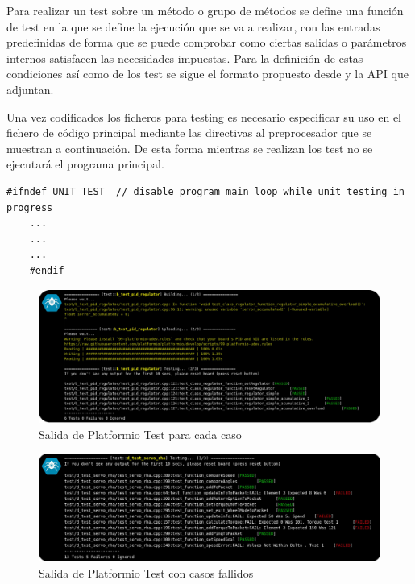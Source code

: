     Para realizar un test sobre un método o grupo de métodos se define una función de test en la que se define la ejecución que se va a realizar, con las entradas predefinidas de forma que se puede comprobar como ciertas salidas o parámetros internos satisfacen las necesidades impuestas. Para la definición de estas condiciones así como de los test se sigue el formato propuesto desde  y la API que adjuntan.

    Una vez codificados los ficheros para testing es necesario especificar su uso en el fichero de código principal  mediante las directivas al preprocesador que se muestran a continuación. De esta forma mientras se realizan los test no se ejecutará el programa principal.

    \begin{lstlisting}[frame=single]
    #ifndef UNIT_TEST  // disable program main loop while unit testing in progress
    ...
    ...
    ...
    #endif
    \end{lstlisting}

    \begin{figure}[H]
       	\centering
       	\includegraphics[width=1\textwidth]{figuras/Imagenes_SW/test/SWTest_1.jpg}
       	\caption{Salida de Platformio Test para cada caso}
       	\label{fig:SW:test:standard_output}
    \end{figure}

    \begin{figure}[H]
       	\centering
       	\includegraphics[width=1\textwidth]{figuras/Imagenes_SW/test/SWTest_3.jpg}
       	\caption{Salida de Platformio Test con casos fallidos}
       	\label{fig:SW:test:error_output}
    \end{figure}

